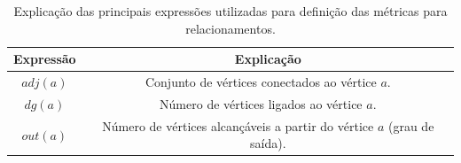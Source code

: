 \begin{table}[ht*]
\centering
\caption{Explicação das principais expressões utilizadas para definição das métricas para relacionamentos.}
\label{table::metricas_rel}
\begin{tabular}{|c|c|}
\toprule
    \textbf{Expressão} & \textbf{Explicação} \\
\midrule
    $adj(a)$           & Conjunto de vértices conectados ao vértice $a$. \tabularnewline \hline
    $dg(a)$            & Número de vértices ligados ao vértice $a$.\tabularnewline \hline
    $out(a)$           & Número de vértices alcançáveis a partir do vértice $a$ (grau de saída).\tabularnewline
\bottomrule
\end{tabular}
\end{table}




